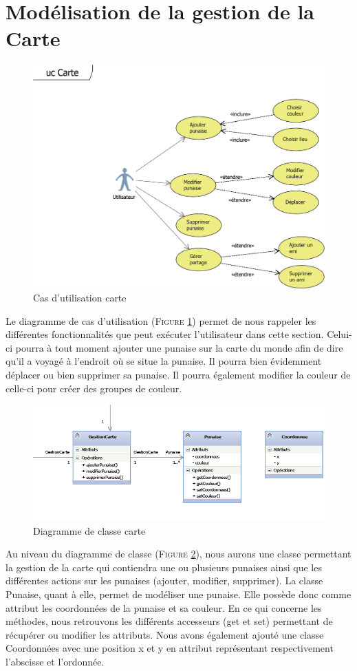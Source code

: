 \documentclass[11pt]{article}
\begin{document}
\section{Modélisation de la gestion de la Carte}
\begin{figure}[!h]
        \centering \includegraphics[scale=1]{ucCarte.png}
        \caption{Cas d'utilisation carte}
         \label{fig:ucCarte}
\end{figure}
Le diagramme de cas d’utilisation  (\textsc{Figure \ref{fig:ucCarte}}) permet de nous rappeler les différentes fonctionnalités que peut exécuter l’utilisateur dans cette section. Celui-ci pourra à tout moment ajouter une punaise sur la carte du monde afin de dire qu’il a voyagé à l’endroit où se situe la punaise. Il pourra bien évidemment déplacer ou bien supprimer sa punaise. Il pourra également modifier la couleur de celle-ci pour créer des groupes de couleur.
\begin{figure}[!h]
        \centering \includegraphics[scale=1]{carte.png}
        \caption{Diagramme de classe carte}
         \label{fig:carte}
\end{figure}
Au niveau du diagramme de classe  (\textsc{Figure \ref{fig:carte}}), nous aurons une classe permettant la gestion de la carte qui contiendra une ou plusieurs punaises ainsi que les différentes actions sur les punaises (ajouter, modifier, supprimer). La classe Punaise, quant à elle, permet de modéliser une punaise. Elle possède donc comme attribut les coordonnées de la punaise et sa couleur. En ce qui concerne les méthodes, nous retrouvons les différents accesseurs (get et set) permettant de récupérer ou modifier les attributs. Nous avons également ajouté une classe Coordonnées avec une position x et y en attribut représentant respectivement l’abscisse et l’ordonnée.
\newpage
\end{document}
